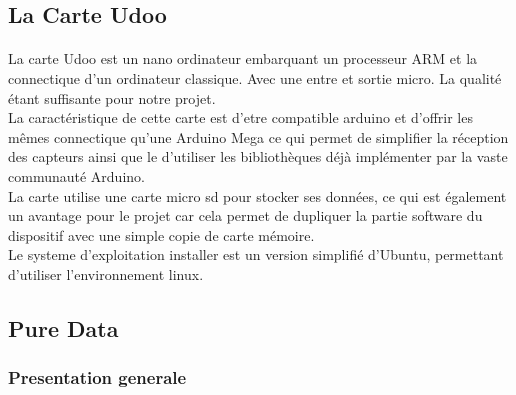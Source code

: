 \documentclass[a4paper, titlepage, oneside, 12pt]{article}%
\begin{document}
\subsection{La Carte Udoo}
\paragraph{}
La carte Udoo est un nano ordinateur embarquant un processeur ARM et la connectique d'un ordinateur classique. Avec une entre et sortie micro. La qualité étant suffisante pour notre projet.\\
La caractéristique de cette carte est d'etre compatible arduino et d'offrir les mêmes connectique qu'une Arduino Mega ce qui permet de simplifier la réception des capteurs ainsi que le d'utiliser les bibliothèques déjà implémenter par la vaste communauté Arduino.\\
La carte utilise une carte micro sd pour stocker ses données, ce qui est également un avantage pour le projet car cela permet de dupliquer la partie software du dispositif avec une simple copie de carte mémoire.\\
Le systeme d'exploitation installer est un version simplifié d'Ubuntu, permettant d'utiliser l’environnement linux.

\subsection{Pure Data}
\subsubsection{Presentation generale}
\end{document}
